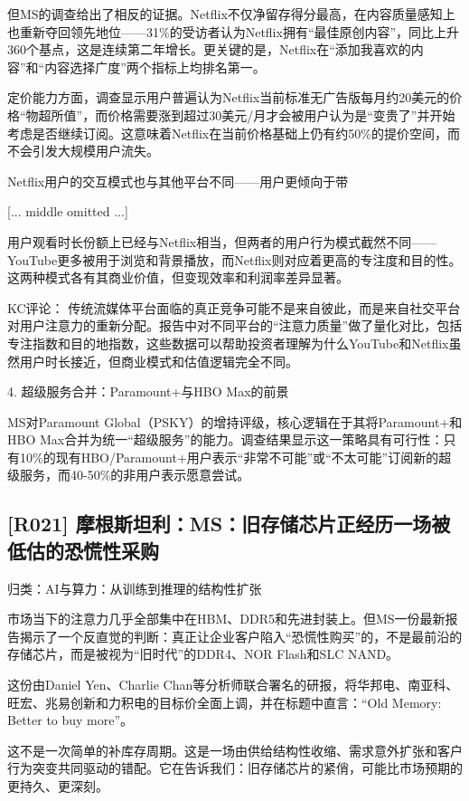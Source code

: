 \documentclass[11pt]{ctexart}
\begin{document}
但MS的调查给出了相反的证据。Netflix不仅净留存得分最高，在内容质量感知上也重新夺回领先地位——31\%的受访者认为Netflix拥有“最佳原创内容”，同比上升360个基点，这是连续第二年增长。更关键的是，Netflix在“添加我喜欢的内容”和“内容选择广度”两个指标上均排名第一。

定价能力方面，调查显示用户普遍认为Netflix当前标准无广告版每月约20美元的价格“物超所值”，而价格需要涨到超过30美元/月才会被用户认为是“变贵了”并开始考虑是否继续订阅。这意味着Netflix在当前价格基础上仍有约50\%的提价空间，而不会引发大规模用户流失。

Netflix用户的交互模式也与其他平台不同——用户更倾向于带

[... middle omitted ...]

用户观看时长份额上已经与Netflix相当，但两者的用户行为模式截然不同——YouTube更多被用于浏览和背景播放，而Netflix则对应着更高的专注度和目的性。这两种模式各有其商业价值，但变现效率和利润率差异显著。

KC评论： 传统流媒体平台面临的真正竞争可能不是来自彼此，而是来自社交平台对用户注意力的重新分配。报告中对不同平台的“注意力质量”做了量化对比，包括专注指数和目的地指数，这些数据可以帮助投资者理解为什么YouTube和Netflix虽然用户时长接近，但商业模式和估值逻辑完全不同。

4. 超级服务合并：Paramount+与HBO Max的前景

MS对Paramount Global（PSKY）的增持评级，核心逻辑在于其将Paramount+和HBO Max合并为统一“超级服务”的能力。调查结果显示这一策略具有可行性：只有10\%的现有HBO/Paramount+用户表示“非常不可能”或“不太可能”订阅新的超级服务，而40-50\%的非用户表示愿意尝试。

\subsection{[R021] 摩根斯坦利：MS：旧存储芯片正经历一场被低估的恐慌性采购}
{\small\color{refgray}归类：AI与算力：从训练到推理的结构性扩张}

市场当下的注意力几乎全部集中在HBM、DDR5和先进封装上。但MS一份最新报告揭示了一个反直觉的判断：真正让企业客户陷入“恐慌性购买”的，不是最前沿的存储芯片，而是被视为“旧时代”的DDR4、NOR Flash和SLC NAND。

这份由Daniel Yen、Charlie Chan等分析师联合署名的研报，将华邦电、南亚科、旺宏、兆易创新和力积电的目标价全面上调，并在标题中直言：“Old Memory: Better to buy more”。

这不是一次简单的补库存周期。这是一场由供给结构性收缩、需求意外扩张和客户行为突变共同驱动的错配。它在告诉我们：旧存储芯片的紧俏，可能比市场预期的更持久、更深刻。
\end{document}
